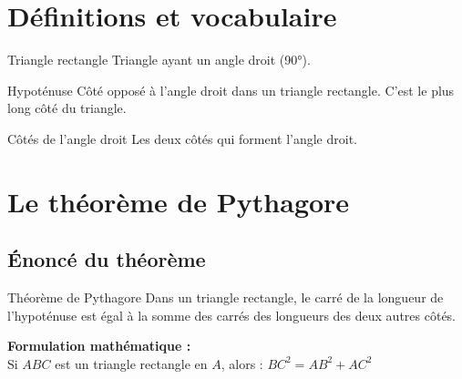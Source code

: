 \section{Définitions et vocabulaire}

\begin{definition}{Triangle rectangle}
Triangle ayant un angle droit (90°).
\end{definition}

\begin{definition}{Hypoténuse}
Côté opposé à l'angle droit dans un triangle rectangle. C'est le plus long côté du triangle.
\end{definition}

\begin{definition}{Côtés de l'angle droit}
Les deux côtés qui forment l'angle droit.
\end{definition}

\section{Le théorème de Pythagore}

\subsection{Énoncé du théorème}

\begin{propriete}{Théorème de Pythagore}
Dans un triangle rectangle, le carré de la longueur de l'hypoténuse est égal à la somme des carrés des longueurs des deux autres côtés.
\end{propriete}

\textbf{Formulation mathématique :}\\
Si $ABC$ est un triangle rectangle en $A$, alors : $BC^2 = AB^2 + AC^2$

\begin{center}
\end{center}

